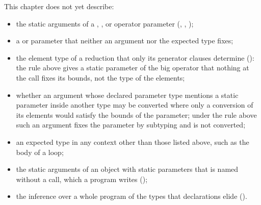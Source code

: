 This chapter does not yet describe:
\begin{itemize}
\item the static arguments of a , ,  or operator
parameter (, , );
\item a  or  parameter that neither an argument nor the
expected type fixes;
\item the element type of a reduction that only its generator clauses determine
(): the rule above gives a static parameter of the big
operator that nothing at the call fixes its bounds, not the type of the
elements;
\item whether an argument whose declared parameter type mentions a static
parameter inside another type may be converted where only a conversion of its
elements would satisfy the bounds of the parameter; under the rule above such
an argument fixes the parameter by subtyping and is not converted;
\item an expected type in any context other than those listed above, such as
the body of a  loop;
\item the static arguments of an object with static parameters that is named
without a call, which a program writes ();
\item the inference over a whole program of the types that declarations elide
().
\end{itemize}
